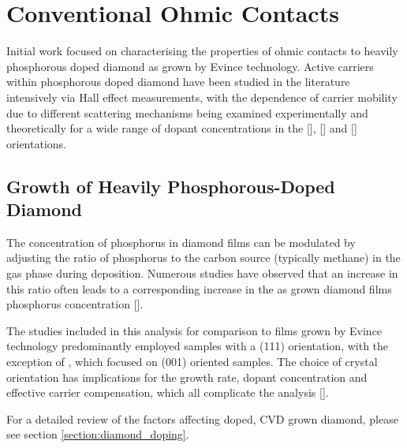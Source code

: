 \section{Conventional Ohmic Contacts}
Initial work focused on characterising the properties of ohmic contacts to heavily phosphorous doped diamond as grown by Evince technology. Active carriers within phosphorous doped diamond have been studied in the literature intensively via Hall effect measurements, with the dependence of carrier mobility due to different scattering mechanisms being examined experimentally and theoretically for a wide range of dopant concentrations in the  [\cite{stenger2013}],  [\cite{stenger2021}] and  [\cite{pinault2021}] orientations.

\subsection{Growth of Heavily Phosphorous-Doped Diamond}
The concentration of phosphorus in diamond films can be modulated by adjusting the ratio of phosphorus to the carbon source (typically methane) in the gas phase during deposition. Numerous studies have observed that an increase in this ratio often leads to a corresponding increase in the as grown diamond films phosphorus concentration [\cite{ohtani2014,grotjohn2014,kato2007,kato2005,kociniewski2006,temahuki2017,katamune2023,koizumi1997,kato2009}]. 

The studies included in this analysis for comparison to films grown by Evince technology predominantly employed samples with a (111) orientation, with the exception of \cite{kato2007}, which focused on (001) oriented samples. The choice of crystal orientation has implications for the growth rate, dopant concentration and effective carrier compensation, which all complicate the analysis [\cite{tokuda2016,mortet2022,pinault2021,stenger2021}]. 

For a detailed review of the factors affecting doped, CVD grown diamond, please see section \ref{section:diamond_doping}.

